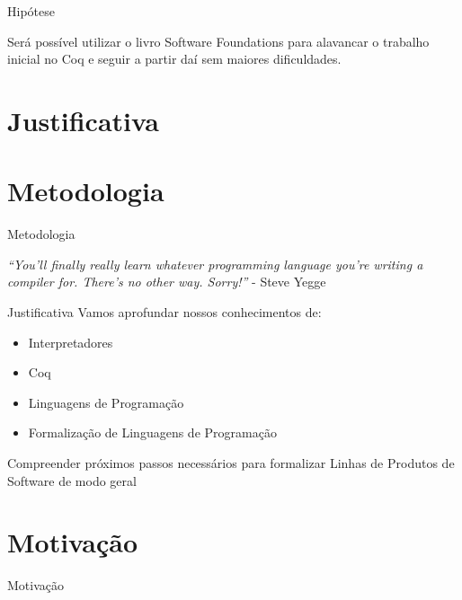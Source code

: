 \documentclass{beamer}
\begin{document}
	
	\begin{frame}{Hipótese}
		\begin{block}{}
			Será possível utilizar o livro Software Foundations para alavancar o trabalho inicial no Coq e seguir a partir daí sem maiores dificuldades.
		\end{block}
	\end{frame}
			
	\section{Justificativa}
	
	
	\section{Metodologia}
	\begin{frame}{Metodologia}
		\centering
		\begin{block}{}
			\textit{``You'll finally really learn whatever programming language you're writing a compiler for. There's	no other way. Sorry!''} -  Steve Yegge
		\end{block}
	\end{frame}
	
	\begin{frame}{Justificativa}
		Vamos aprofundar nossos conhecimentos de:
		\begin{itemize}
			\item Interpretadores
			\item Coq
			\item Linguagens de Programação
			\item Formalização de Linguagens de Programação
		\end{itemize}    
		\begin{block}{}
			Compreender próximos passos necessários para formalizar Linhas de Produtos de Software de modo geral
		\end{block}
	\end{frame}

	
	
	
	\section{Motivação}
	\begin{frame}{Motivação}
		\centering
		\scalebox{2}{Formalizar Haephestus}
	\end{frame}
	
	
\end{document}
